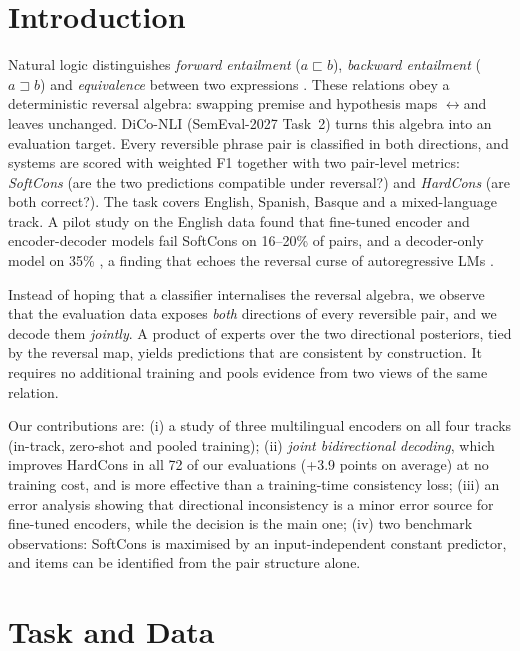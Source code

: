 \section{Introduction}

Natural logic distinguishes \emph{forward entailment} ($a \sqsubset b$), \emph{backward entailment} ($a \sqsupset b$) and \emph{equivalence} between two expressions \citep{maccartney2009natural}. These relations obey a deterministic reversal algebra: swapping premise and hypothesis maps \FE$\leftrightarrow$\BE and leaves \EQ unchanged. DiCo-NLI (SemEval-2027 Task~2) turns this algebra into an evaluation target. Every reversible phrase pair is classified in both directions, and systems are scored with weighted F1 together with two pair-level metrics: \emph{SoftCons} (are the two predictions compatible under reversal?) and \emph{HardCons} (are both correct?). The task covers English, Spanish, Basque and a mixed-language track. A pilot study on the English data found that fine-tuned encoder and encoder-decoder models fail SoftCons on 16--20\% of pairs, and a decoder-only model on 35\% \citep{apaolaza2026assessing}, a finding that echoes the reversal curse of autoregressive LMs \citep{berglund2024reversal}.

Instead of hoping that a classifier internalises the reversal algebra, we observe that the evaluation data exposes \emph{both} directions of every reversible pair, and we decode them \emph{jointly}. A product of experts \citep{hinton2002training} over the two directional posteriors, tied by the reversal map, yields predictions that are consistent by construction. It requires no additional training and pools evidence from two views of the same relation.

Our contributions are:
(i) a study of three multilingual encoders on all four tracks (in-track, zero-shot and pooled training);
(ii) \emph{joint bidirectional decoding}, which improves HardCons in all 72 of our evaluations (+3.9 points on average) at no training cost, and is more effective than a training-time consistency loss;
(iii) an error analysis showing that directional inconsistency is a minor error source for fine-tuned encoders, while the \NO decision is the main one;
(iv) two benchmark observations: SoftCons is maximised by an input-independent constant predictor, and \NO items can be identified from the pair structure alone.

\section{Task and Data}
\label{sec:task}

